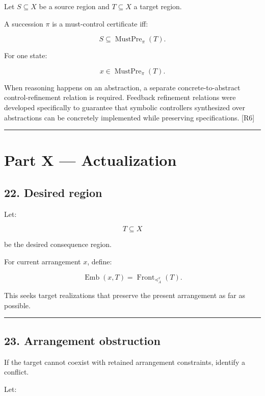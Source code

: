 \documentclass[
]{article}
\begin{document}
Let \(S\subseteq X\) be a source region and \(T\subseteq X\) a target
region.

A succession \(\pi\) is a must-control certificate iff:

\[
\boxed{
S\subseteq\operatorname{MustPre}_\pi(T).
}
\]

For one state:

\[
x\in\operatorname{MustPre}_\pi(T).
\]

When reasoning happens on an abstraction, a separate
concrete-to-abstract control-refinement relation is required. Feedback
refinement relations were developed specifically to guarantee that
symbolic controllers synthesized over abstractions can be concretely
implemented while preserving specifications. {[}R6{]}

\begin{center}\rule{0.5\linewidth}{0.5pt}\end{center}

\section{Part X --- Actualization}\label{part-x-actualization}

\subsection{22. Desired region}\label{desired-region}

Let:

\[
T\subseteq X
\]

be the desired consequence region.

For current arrangement \(x\), define:

\[
\boxed{
\operatorname{Emb}(x,T)
=
\operatorname{Front}_{\preceq_A^x}(T).
}
\]

This seeks target realizations that preserve the present arrangement as
far as possible.

\begin{center}\rule{0.5\linewidth}{0.5pt}\end{center}

\subsection{23. Arrangement obstruction}\label{arrangement-obstruction}

If the target cannot coexist with retained arrangement constraints,
identify a conflict.

Let:
\end{document}
